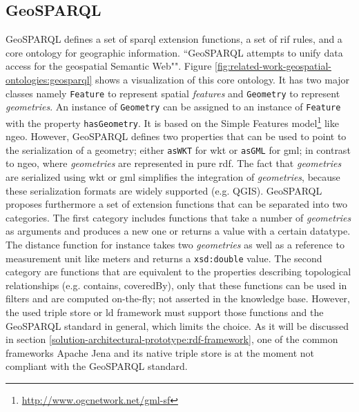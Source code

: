 \documentclass[draft,final]{vutinfth} %
\begin{document}
\subsection{GeoSPARQL}
GeoSPARQL defines a set of \gls{sparql} extension functions, a set of \gls{rif} rules, and a core ontology for geographic information\cite{perry_ogc_2012}. ``GeoSPARQL attempts to unify data access for the geospatial Semantic Web""\cite{battle_geosparql:_2011}. Figure \ref{fig:related-work-geospatial-ontologies:geosparql} shows a visualization of this core ontology. It has two major classes namely \texttt{Feature} to represent spatial \textit{features} and \texttt{Geometry} to represent \textit{geometries}. An instance of \texttt{Geometry} can be assigned to an instance of \texttt{Feature} with the property \texttt{hasGeometry}. It is based on the Simple Features model\footnote{\url{http://www.ogcnetwork.net/gml-sf}} like \gls{ngeo}. However, GeoSPARQL defines two properties that can be used to point to the serialization of a geometry; either \texttt{asWKT} for \gls{wkt} or \texttt{asGML} for \gls{gml}; in contrast to \gls{ngeo}, where \textit{geometries} are represented in pure \gls{rdf}. The fact that \textit{geometries} are serialized using \gls{wkt} or \gls{gml} simplifies the integration of \textit{geometries}, because these serialization formats are widely supported (e.g. QGIS). GeoSPARQL proposes furthermore a set of extension functions that can be separated into two categories. The first category includes functions that take a number of \textit{geometries} as arguments and produces a new one or returns a value with a certain datatype. The distance function for instance takes two \textit{geometries} as well as a reference to measurement unit like meters and returns a \texttt{xsd:double} value. The second category are functions that are equivalent to the properties describing topological relationships (e.g. contains, coveredBy), only that these functions can be used in filters and are computed on-the-fly; not asserted in the knowledge base. However, the used triple store or \gls{ld} framework must support those functions and the GeoSPARQL standard in general, which limits the choice. As it will be discussed in section \ref{solution-architectural-prototype:rdf-framework}, one of the common frameworks Apache Jena and its native triple store is at the moment not compliant with the GeoSPARQL standard. 
\end{document}
